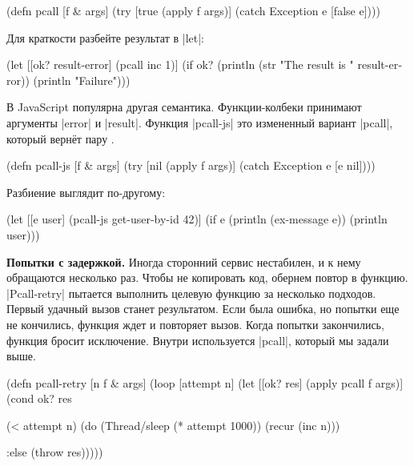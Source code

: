 \begin{english}
  \begin{clojure}
(defn pcall [f & args]
  (try
    [true (apply f args)]
    (catch Exception e [false e])))
  \end{clojure}
\end{english}

\noindent
Для краткости разбейте результат в \spverb|let|:

\begin{english}
  \begin{clojure}
(let [[ok? result-error] (pcall inc 1)]
  (if ok?
    (println (str "The result is " result-error))
    (println "Failure")))
  \end{clojure}
\end{english}

В JavaScript популярна другая семантика. Функции-колбеки принимают
аргументы \spverb|error| и \spverb|result|. Функция \spverb|pcall-js| это
измененный вариант \spverb|pcall|, который верн\"{е}т пару .

\begin{english}
  \begin{clojure}
(defn pcall-js [f & args]
  (try
    [nil (apply f args)]
    (catch Exception e [e nil])))
  \end{clojure}
\end{english}

\noindent
Разбиение выглядит по-другому:

\begin{english}
  \begin{clojure}
(let [[e user] (pcall-js get-user-by-id 42)]
  (if e
    (println (ex-message e))
    (println user)))
  \end{clojure}
\end{english}

\textbf{Попытки с задержкой.} Иногда сторонний сервис нестабилен, и к нему
обращаются несколько раз. Чтобы не копировать код, обернем повтор в
функцию. \spverb|Pcall-retry| пытается выполнить целевую функцию за несколько
подходов. Первый удачный вызов станет результатом. Если была ошибка, но попытки
еще не кончились, функция ждет и повторяет вызов. Когда попытки закончились,
функция бросит исключение. Внутри используется \spverb|pcall|, который мы задали
выше.

\begin{english}
  \begin{clojure}
(defn pcall-retry [n f & args]
  (loop [attempt n]
    (let [[ok? res] (apply pcall f args)]
      (cond
        ok? res

        (< attempt n)
        (do (Thread/sleep (* attempt 1000))
            (recur (inc n)))

        :else (throw res)))))
  \end{clojure}
\end{english}

